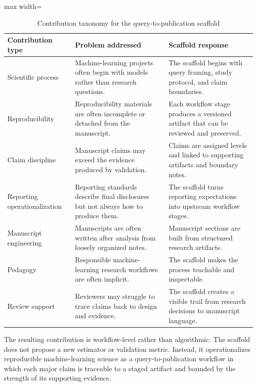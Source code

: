 \begin{table}[htbp]
\centering
\caption{Contribution taxonomy for the query-to-publication scaffold}
\begin{adjustbox}{max width=\textwidth}
\begin{tabularx}{\textwidth}{p{}X X}
\toprule
\textbf{Contribution type} & \textbf{Problem addressed} & \textbf{Scaffold response} \\
\midrule
Scientific process & Machine-learning projects often begin with models rather than research questions. & The scaffold begins with query framing, study protocol, and claim boundaries. \\
Reproducibility & Reproducibility materials are often incomplete or detached from the manuscript. & Each workflow stage produces a versioned artifact that can be reviewed and preserved. \\
Claim discipline & Manuscript claims may exceed the evidence produced by validation. & Claims are assigned levels and linked to supporting artifacts and boundary notes. \\
Reporting operationalization & Reporting standards describe final disclosures but not always how to produce them. & The scaffold turns reporting expectations into upstream workflow stages. \\
Manuscript engineering & Manuscripts are often written after analysis from loosely organized notes. & Manuscript sections are built from structured research artifacts. \\
Pedagogy & Responsible machine-learning research workflows are often implicit. & The scaffold makes the process teachable and inspectable. \\
Review support & Reviewers may struggle to trace claims back to design and evidence. & The scaffold creates a visible trail from research decisions to manuscript language. \\
\bottomrule
\end{tabularx}
\end{adjustbox}
\end{table}

The resulting contribution is workflow-level rather than algorithmic. The scaffold does not propose a new estimator or validation metric. Instead, it operationalizes reproducible machine-learning science as a query-to-publication workflow in which each major claim is traceable to a staged artifact and bounded by the strength of its supporting evidence.
